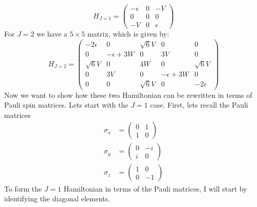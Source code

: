 \documentclass[11pt, letterpaper, titlepage]{article}
\begin{document}
\[
H_{J=1} = 
\begin{pmatrix}
  -ϵ & 0 & -V \\
  0 & 0 & 0 \\
  -V & 0 & ϵ
\end{pmatrix}
\]
For \(J=2\) we have a \(5 × 5\) matrix, which is given by:
\[
H_{J=2} = 
\begin{pmatrix}
  -2ϵ & 0 & \sqrt{6}V & 0 & 0 \\
        0 & -ϵ + 3W & 0 & 3V & 0 \\
        \sqrt{6}V & 0 & 4W & 0 & \sqrt{6}V \\
        0 & 3V & 0 & -ϵ + 3W & 0 \\
        0 & 0 & \sqrt{6}V & 0 & -2ϵ
\end{pmatrix}
\]
Now we want to show how these two Hamiltonian can be rewritten in terms of Pauli spin matrices. \newline
Lets start with the \(J=1\) case. First, lets recall the Pauli matrices
\[
\begin{aligned}
σ_x &= \begin{pmatrix}
        0 & 1 \\
        1 & 0
\end{pmatrix} \\
σ_y &= \begin{pmatrix}
        0 & -i \\
        i & 0
\end{pmatrix} \\
σ_z &= \begin{pmatrix}
        1 & 0 \\
        0 & -1
\end{pmatrix}
\end{aligned}
\]
To form the \(J=1\) Hamiltonian in terms of the Pauli matrices, I will start by identifying the diagonal elements. 
\end{document}
